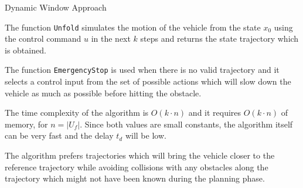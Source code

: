 \begin{algorithm}[]
	\SetAlgoLined
	\DontPrintSemicolon
	
	
	
	
	\BlankLine
	
		
	\caption{Dynamic Window Approach}
	\label{alg:dwa}
\end{algorithm}

The function \texttt{Unfold} simulates the motion of the vehicle from the state $x_0$ using the control command $u$ in the next $k$ steps and returns the state trajectory which is obtained.

The function \texttt{EmergencyStop} is used when there is no valid trajectory and it selects a control input from the set of possible actions which will slow down the vehicle as much as possible before hitting the obstacle.

The time complexity of the algorithm is $O(k\cdot n)$ and it requires $O(k\cdot n)$ of memory, for $n=|U_f|$. Since both values are small constants, the algorithm itself can be very fast and the delay $t_d$ will be low.

The algorithm prefers trajectories which will bring the vehicle closer to the reference trajectory while avoiding collisions with any obstacles along the trajectory which might not have been known during the planning phase.

